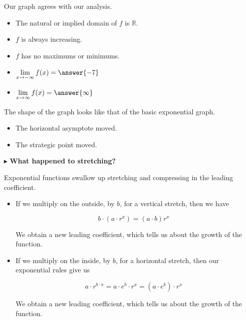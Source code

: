 \documentclass{ximera}
\begin{document}
\begin{example}
\begin{explanation}
Our graph agrees with our analysis.

\begin{itemize}
\item The natural or implied domain of $f$ is $\mathbb{R}$.
\item $f$ is always increasing.
\item $f$ has no maximums or minimums.
\item $\lim\limits_{x \to -\infty} f(x) = \answer{-7}$
\item $\lim\limits_{x \to \infty} f(x) = \answer{\infty}$
\end{itemize}




\end{explanation}

\end{example}


The shape of the graph looks like that of the basic exponential graph. \\


\begin{itemize}
\item The horizontal asymptote moved.
\item The strategic point moved.
\end{itemize}















$\blacktriangleright$ \textbf{What happened to stretching?}


Exponential functions swallow up stretching and compressing in the leading coefficient.


\begin{itemize}
\item If we multiply on the outside, by $b$, for a vertical stretch, then we have

\[
b \cdot (a \cdot r^x) = (a \cdot b) r^x
\]

We obtain a new leading coefficient, which tells us about the growth of the function. \\






\item If we multiply on the inside, by $b$, for a horizontal stretch, then our exponential rules give us

\[
a \cdot r^{b \cdot x} = a \cdot e^b \cdot r^x = (a \cdot e^b) \cdot r^x
\]

We obtain a new leading coefficient, which tells us about the growth of the function.


\end{itemize}
\end{document}
